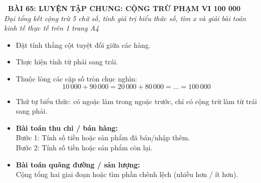 \documentclass[11pt,a4paper]{article}
\begin{document}
\begin{tcolorbox}[
  enhanced,
  colback=white,
  colframe=primary,
  arc=3mm,
  boxrule=1.2pt,
  left=4mm, right=4mm, top=2.5mm, bottom=2.5mm,
  drop shadow=black!10!white
]
  \centering
  {\Large\bfseries\color{primary}\faBookmark\ BÀI 65: LUYỆN TẬP CHUNG: CỘNG TRỪ PHẠM VI 100 000}\\[1.5mm]
  {\small\itshape\color{black!75}Đại tổng kết cộng trừ 5 chữ số, tính giá trị biểu thức số, tìm x và giải bài toán kinh tế thực tế trên 1 trang A4}
\end{tcolorbox}

\vspace{-2mm}


\noindent
\begin{minipage}[t]{0.49\textwidth}\vspace{0pt}
\begin{tcolorbox}[
  enhanced,
  colback=blue!4!white,
  colframe=blue!75!black,
  arc=2mm, boxrule=0.8pt,
  left=2mm, right=2mm, top=1.8mm, bottom=1.8mm,
  title={\footnotesize\bfseries\color{white}\faCalculator\ 1. Kĩ thuật tính toán tổng hợp}
]
{\footnotesize
\begin{itemize}\setlength{\itemsep}{1.5pt}\setlength{\leftskip}{-2.5mm}
  \item Đặt tính thẳng cột tuyệt đối giữa các hàng.
  \item Thực hiện tính từ phải sang trái.
  \item Thuộc lòng các cặp số tròn chục nghìn:
  $$10\,000 + 90\,000 = 20\,000 + 80\,000 = \dots = 100\,000$$
  \item Thứ tự biểu thức: có ngoặc làm trong ngoặc trước, chỉ có cộng trừ làm từ trái sang phải.
\end{itemize}
}
\end{tcolorbox}
\end{minipage}
\hfill
\begin{minipage}[t]{0.49\textwidth}\vspace{0pt}
\begin{tcolorbox}[
  enhanced,
  colback=teal!4!white,
  colframe=teal!75!black,
  arc=2mm, boxrule=0.8pt,
  left=2mm, right=2mm, top=1.8mm, bottom=1.8mm,
  title={\footnotesize\bfseries\color{white}\faSliders\ 2. Giải bài toán có lời văn 2 bước}
]
{\footnotesize
\begin{itemize}\setlength{\itemsep}{1.5pt}\setlength{\leftskip}{-2.5mm}
  \item \textbf{Bài toán thu chi / bán hàng:}\\
  Bước 1: Tính số tiền hoặc sản phẩm đã bán/nhập thêm.\\
  Bước 2: Tính số tiền hoặc sản phẩm còn lại.
  \item \textbf{Bài toán quãng đường / sản lượng:}\\
  Cộng tổng hai giai đoạn hoặc tìm phần chênh lệch (nhiều hơn / ít hơn).
\end{itemize}
}
\end{tcolorbox}
\end{minipage}
\end{document}

